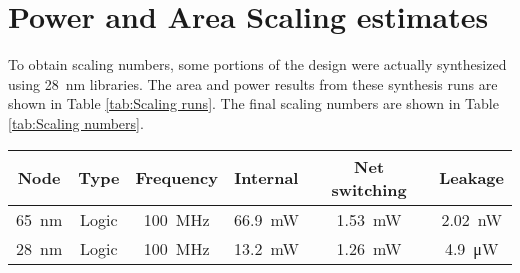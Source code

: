 \section{Power and Area Scaling estimates}
\label{sec:Power and Area Scaling estimates}

To obtain scaling numbers, some portions of the design were actually synthesized using \SI{28}{\nano\meter} libraries.
The area and power results from these synthesis runs are shown in Table \ref{tab:Scaling runs}.  The final scaling numbers are shown in Table \ref{tab:Scaling numbers}.

\begin{table}[h]
  \centering
  \captionsetup{justification=centering}

    \centering
    \begin{subtable}{0.65\textwidth}
        \begin{adjustbox}{width=1\textwidth}
            \footnotesize
            \begin{tabular}{ |c|c|c|c|c|c|  }
              \hline
          Node  &   Type & Frequency                              & Internal                & Net switching           & Leakage                  \\
              \hline
          \SI{65}{\nano\meter}  &  Logic &\SI[per-mode=symbol]{100}{\mega\hertz}  & \SI{66.9}{\milli\watt} & \SI{1.53}{\milli\watt} & \SI{2.02}{\nano\watt}  \\  %
          \SI{28}{\nano\meter}  &  Logic &\SI[per-mode=symbol]{100}{\mega\hertz}  & \SI{13.2}{\milli\watt} & \SI{1.26}{\milli\watt} & \SI{4.9 }{\micro\watt} \\  %

\end{tabular}
\end{adjustbox}
\end{subtable}
\end{table}
